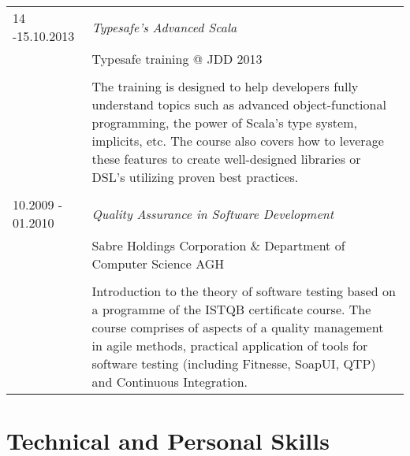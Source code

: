 \documentclass[a4paper,pdftex]{article}
\renewenvironment{itemize}{
  \begin{list}{}{
    \setlength{\leftmargin}{1.5em}
  }
}{
  \end{list}
}
\begin{document}
\begin{itemize}
\item 
  \begin{tabular}{p{}p{}}
   14 -15.10.2013   	   & \itshape Typesafe’s Advanced Scala \\
			& Typesafe training @ JDD 2013 \\
			& \\
			& The training is designed to help developers fully understand topics such as advanced object-functional programming, the power of Scala’s type system, implicits, etc. The course also covers how to leverage these features to create well-designed libraries or DSL’s utilizing proven best practices. \\
			& \\
   10.2009 - 01.2010  & \itshape  Quality Assurance in Software Development \\
                     		& Sabre Holdings Corporation \& Department of Computer Science AGH \\
                      	& \\
                      	& Introduction to the theory of software testing based on a programme of the ISTQB certificate course. The course comprises of aspects of a quality  management in agile methods, practical application of tools for software testing (including Fitnesse, SoapUI, QTP) and Continuous Integration.
  \end{tabular}
\end{itemize}

\section*{Technical and Personal Skills}
\end{document}
